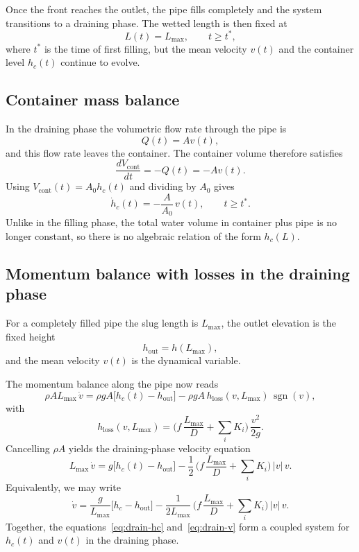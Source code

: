 \documentclass[11pt]{article}
\begin{document}
Once the front reaches the outlet, the pipe fills completely and the system transitions to a
draining phase. The wetted length is then fixed at
\[
  L(t) = L_{\max},\qquad t \ge t^*,
\]
where $t^*$ is the time of first filling, but the mean velocity $v(t)$ and the container level
$h_c(t)$ continue to evolve.

\subsection{Container mass balance}

In the draining phase the volumetric flow rate through the pipe is
\[
  Q(t) = A v(t),
\]
and this flow rate leaves the container. The container volume therefore satisfies
\[
  \frac{dV_{\text{cont}}}{dt} = -Q(t) = -A v(t).
\]
Using $V_{\text{cont}}(t) = A_0 h_c(t)$ and dividing by $A_0$ gives
\begin{equation}
  \dot h_c(t) = -\frac{A}{A_0}\,v(t),\qquad t \ge t^*.
  \label{eq:drain-hc}
\end{equation}
Unlike in the filling phase, the total water volume in container plus pipe is no longer
constant, so there is no algebraic relation of the form $h_c(L)$.

\subsection{Momentum balance with losses in the draining phase}

For a completely filled pipe the slug length is $L_{\max}$, the outlet elevation is the fixed height
\[
  h_{\text{out}} = h(L_{\max}),
\]
and the mean velocity $v(t)$ is the dynamical variable.

The momentum balance along the pipe now reads
\[
  \rho A L_{\max}\,\dot v
  = \rho g A\bigl[h_c(t) - h_{\text{out}}\bigr]
    - \rho g A\,h_{\text{loss}}(v,L_{\max})\,\operatorname{sgn}(v),
\]
with
\[
  h_{\text{loss}}(v,L_{\max})
  = \Big(f\,\frac{L_{\max}}{D} + \sum_i K_i\Big)\,\frac{v^2}{2g}.
\]
Cancelling $\rho A$ yields the draining-phase velocity equation
\begin{equation}
  L_{\max}\,\dot v
  = g\bigl[h_c(t) - h_{\text{out}}\bigr]
    - \frac{1}{2}\,\Big(f\,\frac{L_{\max}}{D} + \sum_i K_i\Big)\,|v|\,v.
  \label{eq:drain-v-L}
\end{equation}
Equivalently, we may write
\begin{equation}
  \dot v
  = \frac{g}{L_{\max}}\bigl[h_c - h_{\text{out}}\bigr]
    - \frac{1}{2L_{\max}}\,\Big(f\,\frac{L_{\max}}{D} + \sum_i K_i\Big)\,|v|\,v.
  \label{eq:drain-v}
\end{equation}
Together, the equations~\eqref{eq:drain-hc} and~\eqref{eq:drain-v}
form a coupled system for $h_c(t)$ and $v(t)$ in the draining phase.
\end{document}
